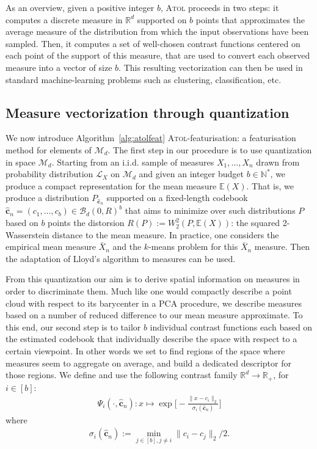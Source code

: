 \documentclass[twoside]{article}
\newcommand{\cb}{\mathbf{c}}
\begin{document}
As an overview, given a positive integer $b$, \textsc{Atol} proceeds in two steps: it computes a discrete measure in $\mathbb{R}^d$ supported on $b$ points that approximates the average measure of the distribution from which the input observations have been sampled. Then, it computes a set of well-chosen contrast functions centered on each point of the support of this measure, that are used to convert each observed measure into a vector of size $b$. This resulting vectorization can then be used in standard machine-learning problems such as clustering, classification, etc.


\subsection{Measure vectorization through quantization} \label{sec:measure-vect}

We now introduce Algorithm~\ref{alg:atolfeat} \textsc{Atol}-featurisation: a featurisation method for elements of $\mathcal{M}_d$. The first step in our procedure is to use quantization in space $\mathcal{M}_d$. Starting from an i.i.d. sample of measures $X_1,\dots, X_n$ drawn from probability distribution $\mathcal{L}_X$ on $\mathcal{M}_d$ and given an integer budget $b\in\mathbb{N}^*$, we produce a compact representation for the mean measure $\mathbb{E}(X)$. That is, we produce a distribution $P_{\hat{\cb}_n}$ supported on a fixed-length codebook $\hat{\cb}_n = (c_1, \dots, c_b) \in \mathcal{B}_d(0, R)^b$ that aims to minimize over such distributions $P$ based on $b$ points the distorsion $R(P) := W_2^2(P, \mathbb{E}(X))$: the squared 2-Wasserstein distance to the mean measure. In practice, one considers the empirical mean measure $\bar{X}_n$ and the $k$-means problem for this $\bar{X}_n$ measure. Then the adaptation of Lloyd's \cite{Lloyd82} algorithm to measures can be used.

From this quantization our aim is to derive spatial information on measures in order to discriminate them. Much like one would compactly describe a point cloud with respect to its barycenter in a PCA procedure, we describe measures based on a number of reduced difference to our mean measure approximate. To this end, our second step is to tailor $b$ individual contrast functions each based on the estimated codebook that individually describe the space with respect to a certain viewpoint. In other words we set to find regions of the space where measures seem to aggregate on average, and build a dedicated descriptor for those regions. We define and use the following contrast family $\mathbb{R}^d \rightarrow \mathbb{R}_+$, for $i\in [b]$:
\begin{align}
\label{contrast}
	\Psi_i(\cdot, \hat{\cb}_n) : x \mapsto \exp\big[-\frac{\|x - c_i \|_2}{\sigma_i(\hat{\cb}_n)} \big]
\end{align}
where
\begin{align}
	\label{spread} \sigma_i(\hat{\cb}_n) := \min_{j\in [b], j\neq i} \|c_i - c_j\|_2/2.
\end{align}
\end{document}
